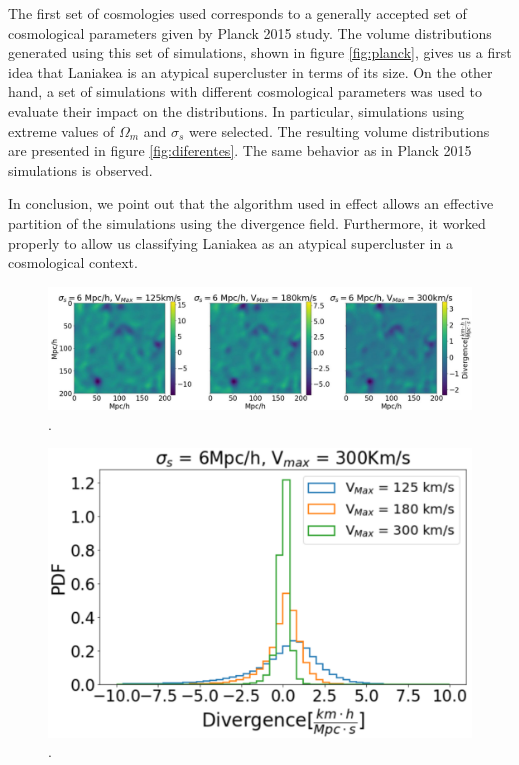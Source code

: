\documentclass[usenatbib]{mnras}
\begin{document}
The first set of cosmologies used corresponds to a generally accepted set of cosmological parameters given by Planck 2015 study. The volume distributions generated using this set of simulations, shown in figure \ref{fig:planck}, gives us a first idea that Laniakea is an atypical supercluster in terms of its size. On the other hand, a set of simulations with different cosmological parameters was used to evaluate their impact on the distributions. In particular, simulations using extreme values of $\Omega_m$ and $\sigma_s$ were selected. The resulting volume distributions are presented in figure \ref{fig:diferentes}. The same behavior as in Planck 2015 simulations is observed. 

In conclusion, we point out that the algorithm used in effect allows an effective partition of the simulations using the divergence field. Furthermore, it worked properly to allow us classifying Laniakea as an atypical supercluster in a cosmological context.


\begin{figure}
    \centering
    \includegraphics[width=525pt]{watershed_sigma_06_vmax_x.pdf}
    \caption{.}  
    \label{fig:Wat_06_vel_x}
\end{figure}

\begin{figure}
    \centering
    \includegraphics[width=400pt]{grad_dist_sigma_6_vmax_x.pdf}
    \caption{.}  
    \label{fig:Wat_06_vel_x}
\end{figure}





\end{document}
